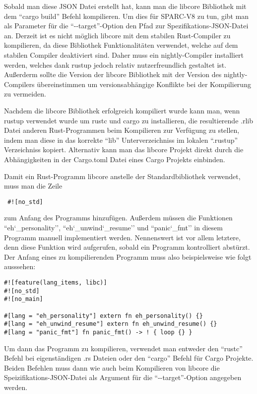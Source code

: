 Sobald man diese JSON Datei erstellt hat, kann man die libcore Bibliothek mit dem ``cargo build'' Befehl kompilieren.
Um dies für SPARC-V8 zu tun, gibt man als Parameter für die ``-{}-target''-Option den Pfad zur Spezifikations-JSON-Datei an.
Derzeit ist es nicht möglich libcore mit dem stabilen Rust-Compiler zu kompilieren, da diese Bibliothek Funktionalitäten
verwendet, welche auf dem stabilen Compiler deaktiviert sind. Daher muss ein nightly-Compiler installiert werden, welches
dank rustup jedoch relativ nutzerfreundlich gestaltet ist. Außerderm sollte die Version der libcore Bibliothek
mit der Version des nightly-Compilers übereinstimmen um versionsabhängige Konflikte bei der Kompilierung zu vermeiden.

Nachdem die libcore Bibliothek erfolgreich kompiliert wurde kann man, wenn rustup verwendet wurde um rustc und cargo zu installieren, 
die resultierende .rlib Datei anderen Rust-Programmen beim Kompilieren zur Verfügung zu stellen,
indem man diese in das korrekte ``lib'' Unterverzeichniss im lokalen ``.rustup'' Verzeichniss kopiert.
Alternativ kann man das libcore Projekt direkt durch die Abhängigkeiten in der Cargo.toml Datei
eines Cargo Projekts einbinden.

Damit ein Rust-Programm libcore anstelle der Standardbibliothek verwendet, muss man die Zeile 
\begin{verbatim} #![no_std] \end{verbatim}
zum Anfang des Programms hinzufügen. Außerdem müssen die Funktionen ``eh\char`_personality'', ``eh\char`_unwind\char`_resume'' und
``panic\char`_fmt'' in diesem Programm manuell implementiert werden. Nennenswert ist vor allem letztere, denn diese Funktion
wird aufgerufen, sobald ein Programm kontrolliert abstürzt.
Der Anfang eines zu kompilierenden Programm muss also beispielsweise wie folgt ausssehen:
\begin{verbatim}
#![feature(lang_items, libc)]
#![no_std]
#![no_main]

#[lang = "eh_personality"] extern fn eh_personality() {}
#[lang = "eh_unwind_resume"] extern fn eh_unwind_resume() {}
#[lang = "panic_fmt"] fn panic_fmt() -> ! { loop {} }
\end{verbatim}

Um dann das Programm zu kompilieren, verwendet man entweder den ``rustc'' Befehl bei eigenständigen .rs Dateien oder den
``cargo'' Befehl für Cargo Projekte. Beiden Befehlen muss dann wie auch beim Kompilieren von libcore die Speizifikations-JSON-Datei
als Argument für die ``-{}-target''-Option angegeben werden. 

